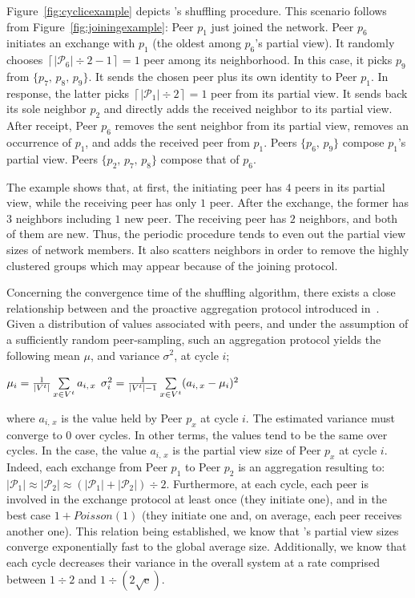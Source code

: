 Figure~\ref{fig:cyclicexample} depicts \SPRAY's shuffling procedure. This
scenario follows from Figure~\ref{fig:joiningexample}: Peer $p_1$ just joined
the network. Peer $p_6$ initiates an exchange with $p_1$ (the oldest among 
$p_6$'s partial view). It randomly chooses
$\left\lceil{|\mathcal{P}_6|\div 2} - 1 \right \rceil = 1$ peer among its
neighborhood. In this case, it picks $p_9$ from $\{p_7,\,p_8,\,p_9\}$.  It sends
the chosen peer plus its own identity to Peer $p_1$. In response, the latter
picks $\left\lceil{|\mathcal{P}_1|\div 2}\right\rceil = 1$ peer from its partial
view. It sends back its sole neighbor $p_2$ and directly adds the received
neighbor to its partial view. After receipt, Peer $p_6$ removes the sent
neighbor from its partial view, removes an occurrence of $p_1$, and adds the
received peer from $p_1$. Peers $\{p_6,\,p_9\}$ compose $p_1$'s partial
view. Peers $\{p_2,\,p_7,\,p_8\}$ compose that of $p_6$.

The example shows that, at first, the initiating peer has $4$ peers in
its partial view, while the receiving peer has only $1$ peer.
After the exchange, the former has $3$ neighbors including $1$ new
peer. The receiving peer has $2$ neighbors, and both of them are
new. Thus, the periodic procedure tends to even out the partial view
sizes of network members. It also scatters neighbors in order to remove
the highly clustered groups which may appear because of the joining
protocol.

Concerning the convergence time of the shuffling algorithm, there
exists a close relationship between \SPRAY and the proactive
aggregation protocol introduced
in~\cite{jelasity2004epidemic}. Given a
distribution of values associated with peers, and under the assumption
of a sufficiently random peer-sampling, such an aggregation protocol
yields the following mean $\mu$, and variance $\sigma^2$, at cycle
$i$;
\begin{center}
  $\mu_i = {1\over{|V^t|}} \sum\limits_{x \in V^t} a_{i,\,x}$
  \hfill
  $\sigma^2_i = {1\over{|V^t|-1}}\sum\limits_{x \in V^t}
  (a_{i,\,x} - \mu_i)^2$
\end{center}
where $a_{i,\,x}$ is the value held by Peer $p_x$ at cycle $i$. The
estimated variance must converge to $0$ over cycles. In other terms,
the values tend to be the same over cycles. In the \SPRAY case, the
value $a_{i,\,x}$ is the partial view size of Peer $p_x$ at cycle
$i$. Indeed, each exchange from Peer $p_1$ to Peer $p_2$ is an
aggregation resulting to:
$|\mathcal{P}_1|\approx|\mathcal{P}_2|\approx{(|\mathcal{P}_1| +
  |\mathcal{P}_2|) \div 2}$.  Furthermore, at each cycle, each peer is
involved in the exchange protocol at least once (they initiate one),
and in the best case $1+Poisson(1)$ (they initiate one and, on average,
each peer receives another one). This relation being established, we
know that \SPRAY's partial view sizes converge exponentially fast to
the global average size. Additionally, we know that each cycle
decreases their variance in the overall system at a rate comprised
between ${1\div 2}$ and $1\div ({2\sqrt{\text{e}}})$.

